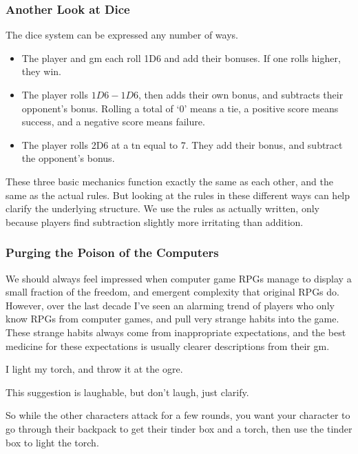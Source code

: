 \begin{multicols}{2}
\subsubsection{Another Look at Dice}

The dice system can be expressed any number of ways.

\begin{itemize}

  \item
  The player and \gls{gm} each roll 1D6 and add their bonuses.
  If one rolls higher, they win.
  \item
  The player rolls $1D6-1D6$, then adds their own bonus, and subtracts their opponent's bonus.
  Rolling a total of `0' means a tie, a positive score means success, and a negative score means failure.
  \item
  The player rolls 2D6 at a \gls{tn} equal to 7.
  They add their bonus, and subtract the opponent's bonus.

\end{itemize}

\noindent
These three basic mechanics function exactly the same as each other, and the same as the actual rules.
But looking at the rules in these different ways can help clarify the underlying structure.
We use the rules as actually written, only because players find subtraction slightly more irritating than addition.

\subsubsection{Purging the Poison of the Computers}

We should always feel impressed when computer game RPGs manage to display a small fraction of the freedom, and emergent complexity that original RPGs do.
However, over the last decade I've seen an alarming trend of players who only know RPGs from computer games, and pull very strange habits into the game.
These strange habits always come from inappropriate expectations, and the best medicine for these expectations is usually clearer descriptions from their \gls{gm}.

\begin{boxtext}
  I light my torch, and throw it at the ogre.
\end{boxtext}

This suggestion is laughable, but don't laugh, just clarify.

\begin{speechtext}
  So while the other characters attack for a few rounds, you want your character to go through their backpack to get their tinder box and a torch, then use the tinder box to light the torch.


\end{speechtext}
\end{multicols}
